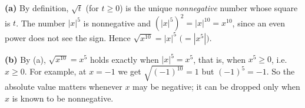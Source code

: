 \textbf{(a)} By definition, $\sqrt{t}$ (for $t\ge0$) is the unique \emph{nonnegative} number whose square is $t$. The number $|x|^5$ is nonnegative and $(|x|^5)^2=|x|^{10}=x^{10}$, since an even power does not see the sign. Hence $\sqrt{x^{10}}=|x|^5$ $\bigl(=|x^5|\bigr)$.

\textbf{(b)} By (a), $\sqrt{x^{10}}=x^5$ holds exactly when $|x|^5=x^5$, that is, when $x^5\ge0$, i.e.\ $\boxed{x\ge0}$. For example, at $x=-1$ we get $\sqrt{(-1)^{10}}=1$ but $(-1)^5=-1$. So the absolute value matters whenever $x$ may be negative; it can be dropped only when $x$ is known to be nonnegative.
